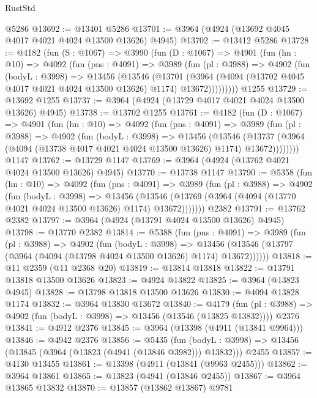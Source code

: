 \begin{lexlean}{RustStd}
\begin{coremodule}
    @5286
@13692 := @13401 @5286
@13701 := @3964 (@4924 (@13692 @4045 @4017 @4021 @4024 @13500 @13626) @4945)
@13702 := @13412 @5286
@13728 := @4182
    (fun (S : @1067) =>
    @3990
      (fun (D : @1067) =>
      @4901
        (fun (hn : @10) =>
        @4092
          (fun (pns : @4091) =>
          @3989
            (fun (pl : @3988) =>
            @4902
              (fun (bodyL : @3998) =>
              @13456
                (@13546
                  (@13701
                    (@3964
                      (@4094 (@13702 @4045 @4017 @4021 @4024 @13500 @13626) @1174)
                      @13672)))))))))
    @1255
@13729 := @13692 @1255
@13737 := @3964 (@4924 (@13729 @4017 @4021 @4024 @13500 @13626) @4945)
@13738 := @13702 @1255
@13761 := @4182
    (fun (D : @1067) =>
    @4901
      (fun (hn : @10) =>
      @4092
        (fun (pns : @4091) =>
        @3989
          (fun (pl : @3988) =>
          @4902
            (fun (bodyL : @3998) =>
            @13456
              (@13546
                (@13737 (@3964 (@4094 (@13738 @4017 @4021 @4024 @13500 @13626) @1174) @13672))))))))
    @1147
@13762 := @13729 @1147
@13769 := @3964 (@4924 (@13762 @4021 @4024 @13500 @13626) @4945)
@13770 := @13738 @1147
@13790 := @5358
    (fun (hn : @10) =>
    @4092
      (fun (pns : @4091) =>
      @3989
        (fun (pl : @3988) =>
        @4902
          (fun (bodyL : @3998) =>
          @13456
            (@13546 (@13769 (@3964 (@4094 (@13770 @4021 @4024 @13500 @13626) @1174) @13672)))))))
    @2382
@13791 := @13762 @2382
@13797 := @3964 (@4924 (@13791 @4024 @13500 @13626) @4945)
@13798 := @13770 @2382
@13814 := @5388
    (fun (pns : @4091) =>
    @3989
      (fun (pl : @3988) =>
      @4902
        (fun (bodyL : @3998) =>
        @13456 (@13546 (@13797 (@3964 (@4094 (@13798 @4024 @13500 @13626) @1174) @13672))))))
@13818 := @11 @2359 (@11 @2368 @20)
@13819 := @13814 @13818
@13822 := @13791 @13818 @13500 @13626
@13823 := @4924 @13822
@13825 := @3964 (@13823 @4945)
@13828 := @13798 @13818 @13500 @13626
@13830 := @4094 @13828 @1174
@13832 := @3964 @13830 @13672
@13840 := @4179
    (fun (pl : @3988) => @4902 (fun (bodyL : @3998) => @13456 (@13546 (@13825 @13832))))
    @2376
@13841 := @4912 @2376
@13845 := @3964 (@13398 (@4911 (@13841 @9964)))
@13846 := @4942 @2376
@13856 := @5435
    (fun (bodyL : @3998) => @13456 (@13845 (@3964 (@13823 (@4941 (@13846 @3982))) @13832)))
    @2455
@13857 := @4130 @13455
@13861 := @13398 (@4911 (@13841 (@9963 @2455)))
@13862 := @3964 @13861
@13865 := @13823 (@4941 (@13846 @2455))
@13867 := @3964 @13865 @13832
@13870 := @13857 (@13862 @13867) @9781

\end{coremodule}
\end{lexlean}
